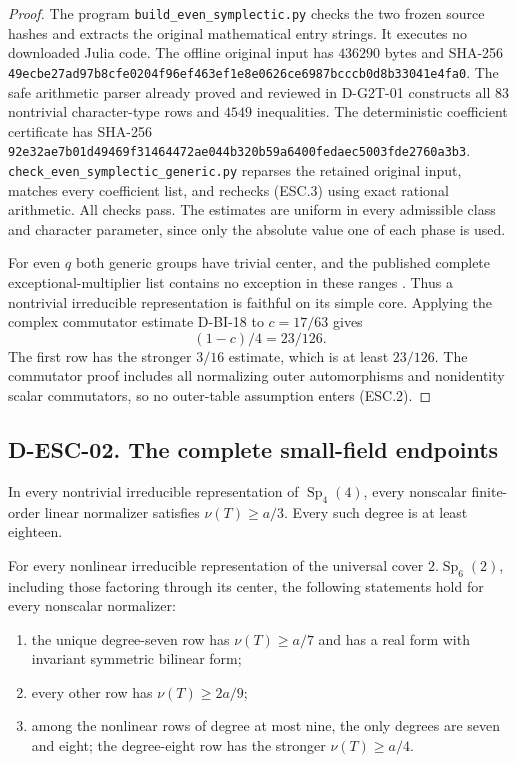 \begin{proof}
The program \texttt{build\_even\_symplectic.py} checks the two
frozen source hashes and extracts the original mathematical
entry strings.  It executes no downloaded Julia code.
The offline original input has $436290$ bytes and SHA-256
\texttt{49ecbe27ad97b8cfe0204f96ef463ef1e8e0626ce6987bcccb0d8b33041e4fa0}.
The safe arithmetic parser already proved and reviewed in
D-G2T-01 constructs all $83$ nontrivial character-type rows
and $4549$ inequalities.  The deterministic coefficient
certificate has SHA-256
\texttt{92e32ae7b01d49469f31464472ae044b320b59a6400fedaec5003fde2760a3b3}.
\texttt{check\_even\_symplectic\_generic.py} reparses the
retained original input, matches every coefficient list, and
rechecks (ESC.3) using exact rational arithmetic.  All checks
pass.  The estimates are uniform in every admissible class
and character parameter, since only the absolute value one
of each phase is used.

For even $q$ both generic groups have trivial center, and the
published complete exceptional-multiplier list contains no
exception in these ranges \cite[Chapter~5, Table~1,
numbered p.~35]{BI:HHM}.  Thus a nontrivial irreducible
representation is faithful on its simple core.  Applying
the complex commutator estimate D-BI-18 to $c=17/63$ gives
\[
                       (1-c)/4=23/126.
\]
The first row has the stronger $3/16$ estimate, which is at
least $23/126$.  The commutator proof includes all normalizing
outer automorphisms and nonidentity scalar commutators, so
no outer-table assumption enters (ESC.2).
\end{proof}

\subsection*{D-ESC-02. The complete small-field endpoints}

\begin{lemma}
\label{D-ESC-02}
In every nontrivial irreducible representation of
$\operatorname{Sp}_4(4)$, every nonscalar finite-order linear
normalizer satisfies $\nu(T)\ge a/3$.  Every such degree is
at least eighteen.

For every nonlinear irreducible representation of the universal
cover $2.\operatorname{Sp}_6(2)$, including those factoring
through its center, the following statements hold for every
nonscalar normalizer:
\begin{enumerate}
\item the unique degree-seven row has $\nu(T)\ge a/7$ and
has a real form with invariant symmetric bilinear form;
\item every other row has $\nu(T)\ge2a/9$;
\item among the nonlinear rows of degree at most nine, the
only degrees are seven and eight; the degree-eight row has
the stronger $\nu(T)\ge a/4$.
\end{enumerate}
\end{lemma}

